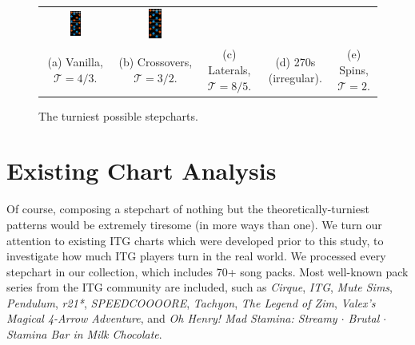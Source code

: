 \documentclass[10pt]{sigplanconf}
\begin{document}
\begin{figure}[t]
\begin{center}
\begin{tabular}{ccccc}
		\includegraphics[width=0.17\textwidth]{result-irregular-270.png} &
		\includegraphics[width=0.17\textwidth]{result-2-spin.png} \\
		\small (a) Vanilla, $\mathcal{T}=4/3$. &
		\small (b) Crossovers, $\mathcal{T}=3/2$. &
		\small (c) Laterals, $\mathcal{T}=8/5$. &
		\small (d) 270s (irregular). &
		\small (e) Spins, $\mathcal{T}=2$.
	\end{tabular}
	\end{center}
	\caption{The turniest possible stepcharts.}
	\label{fig:sequences}
\end{figure}


\section{Existing Chart Analysis}

Of course, composing a stepchart of nothing but the theoretically-turniest patterns would be extremely tiresome (in more ways than one).
We turn our attention to existing ITG charts which were developed prior to this study, to investigate how much ITG players turn in the real world.
We processed every stepchart in our collection, which includes 70+ song packs.
Most well-known pack series from the ITG community are included, such as {\em Cirque}, {\em ITG}, {\em Mute Sims}, {\em Pendulum}, {\em r21*}, {\em SPEEDCOOOORE}, {\em Tachyon}, {\em The Legend of Zim}, {\em Valex's Magical 4-Arrow Adventure}, and {\em Oh Henry! Mad Stamina: Streamy $\cdot$ Brutal $\cdot$ Stamina Bar in Milk Chocolate}.
\end{document}
